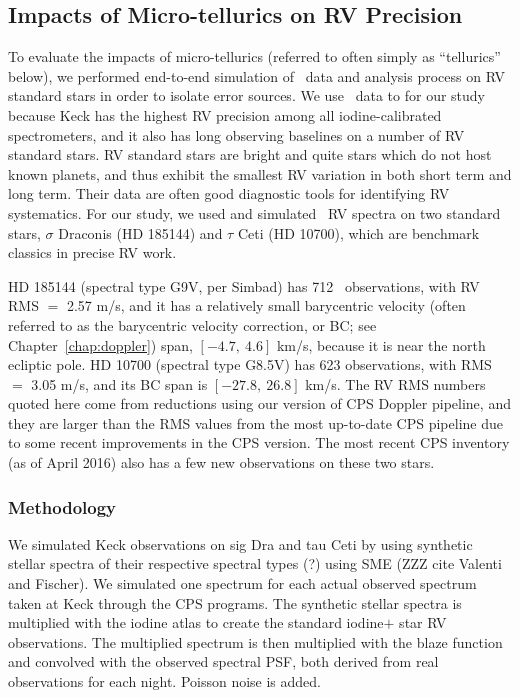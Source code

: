 \subsection{Impacts of Micro-tellurics on RV Precision}\label{keck:telluric:method}

To evaluate the impacts of micro-tellurics (referred to often simply
as ``tellurics'' below), we performed end-to-end simulation of \keck\
data and analysis process on RV standard stars in order to isolate
error sources. We use \keck\ data to for our study because Keck has
the highest RV precision among all iodine-calibrated spectrometers,
and it also has long observing baselines on a number of RV standard
stars. RV standard stars are bright and quite stars which do not host
known planets, and thus exhibit the smallest RV variation in both
short term and long term. Their data are often good diagnostic tools
for identifying RV systematics. For our study, we used and simulated
\keck\ RV spectra on two standard stars, $\sigma$ Draconis (HD 185144)
and $\tau$ Ceti (HD 10700), which are benchmark classics in precise RV
work.

HD 185144 (spectral type G9V, per Simbad) has 712 \keck\ observations,
with RV RMS $=$ 2.57 m/s, and it has a relatively small barycentric
velocity (often referred to as the barycentric velocity correction, or
BC; see Chapter~\ref{chap:doppler}) span, $[-4.7,\ 4.6]$ km/s, because
it is near the north ecliptic pole. HD 10700 (spectral type G8.5V) has
623 observations, with RMS $=$ 3.05 m/s, and its BC span is $[-27.8,\
26.8]$ km/s. The RV RMS numbers quoted here come from reductions using
our version of CPS Doppler pipeline, and they are larger than the RMS
values from the most up-to-date CPS pipeline due to some recent
improvements in the CPS version. The most recent CPS inventory (as of
April 2016) also has a few new observations on these two stars.


\subsubsection{Methodology}\label{keck:telluric:method}

We simulated Keck observations on sig Dra and tau Ceti by using
synthetic stellar spectra of their respective spectral types (?) using
SME (ZZZ cite Valenti and Fischer). We simulated one spectrum for each
actual observed spectrum taken at Keck through the CPS programs. The
synthetic stellar spectra is multiplied with the iodine atlas to
create the standard iodine$+$ star RV observations. The multiplied
spectrum is then multiplied with the blaze function and convolved with
the observed spectral PSF, both derived from real observations for
each night. Poisson noise is added.

